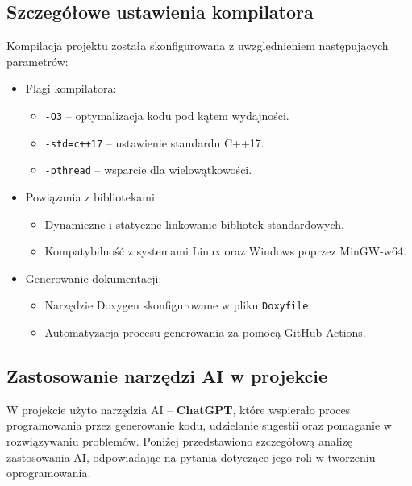 \subsection{Szczegółowe ustawienia kompilatora}
Kompilacja projektu została skonfigurowana z uwzględnieniem następujących parametrów:
\begin{itemize}
  \item Flagi kompilatora:
        \begin{itemize}
          \item \texttt{-O3} – optymalizacja kodu pod kątem wydajności.
          \item \texttt{-std=c++17} – ustawienie standardu C++17.
          \item \texttt{-pthread} – wsparcie dla wielowątkowości.
        \end{itemize}
  \item Powiązania z bibliotekami:
        \begin{itemize}
          \item Dynamiczne i statyczne linkowanie bibliotek standardowych.
          \item Kompatybilność z systemami Linux oraz Windows poprzez MinGW-w64.
        \end{itemize}
  \item Generowanie dokumentacji:
        \begin{itemize}
          \item Narzędzie Doxygen skonfigurowane w pliku \texttt{Doxyfile}.
          \item Automatyzacja procesu generowania za pomocą GitHub Actions.
        \end{itemize}
\end{itemize}

\subsection{Zastosowanie narzędzi AI w projekcie}
W projekcie użyto narzędzia AI – \textbf{ChatGPT}, które wspierało proces programowania przez generowanie kodu, udzielanie sugestii oraz pomaganie w rozwiązywaniu problemów. Poniżej przedstawiono szczegółową analizę zastosowania AI, odpowiadając na pytania dotyczące jego roli w tworzeniu oprogramowania.

